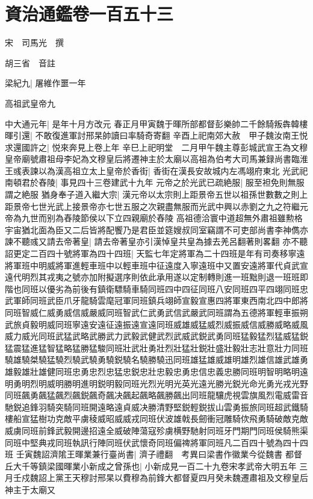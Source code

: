 \chapter{資治通鑑卷一百五十三}
宋　司馬光　撰

胡三省　音註

梁紀九|{
	屠維作噩一年}


高祖武皇帝九

中大通元年|{
	是年十月方改元}
春正月甲寅魏于暉所部都督彭樂帥二千餘騎叛犇韓樓暉引還|{
	不敢復進軍討邢杲帥讀曰率騎奇寄翻}
辛酉上祀南郊大赦　甲子魏汝南王悦求還國許之|{
	悦來奔見上卷上年}
辛巳上祀明堂　二月甲午魏主尊彭城武宣王為文穆皇帝廟號肅祖母李妃為文穆皇后將遷神主於太廟以高祖為伯考大司馬兼録尚書臨淮王彧表諫以為漢高祖立太上皇帝於香街|{
	香街在漢長安故城内左馮翊府東北}
光武祀南頓君於舂陵|{
	事見四十三卷建武十九年}
元帝之於光武已疏絶服|{
	服至袒免則無服謂之絶服}
猶身奉子道入繼大宗|{
	漢元帝以太宗則上距景帝五世以祖孫世數數之則上距景帝七世光武上接景帝亦七世五服之次親盡無服而光武中興以赤劉之九之符繼元帝為九世而别為舂陵節侯以下立四親廟於舂陵}
高祖德洽寰中道超無外肅祖雖勲格宇宙猶北面為臣又二后皆將配饗乃是君臣並筵嫂叔同室竊謂不可吏部尚書李神儁亦諫不聽彧又請去帝著皇|{
	請去帝著皇亦引漢悼皇共皇為據去羌呂翻著則畧翻}
亦不聽　詔更定二百四十號將軍為四十四班|{
	天監七年定將軍為二十四班是年有司奏移寧遠將軍班中明威將軍進輕車班中以輕車班中征遠度入寧遠班中又置安遠將軍代貞武宣遠代明烈其戎夷之號亦加附擬選序則依此承用遂以定制轉則進一班黜則退一班班即階也同班以優劣為前後有鎮衛驃騎車騎同班四中四征同班八安同班四平四翊同班忠武軍師同班武臣爪牙龍騎雲麾冠軍同班鎮兵翊師宣毅宣惠四將軍東西南北四中郎將同班智威仁威勇威信威嚴威同班智武仁武勇武信武嚴武同班謂為五德將軍輕車振朔武旅貞毅明威同班寧遠安遠征遠振遠宣遠同班威雄威猛威烈威振威信威勝威略威風威力威光同班武猛武略武勝武力武毅武健武烈武威武鋭武勇同班猛毅猛烈猛威猛鋭猛震猛進猛智猛略猛勝猛駿同班壯武壯勇壯烈壯猛壯鋭壯盛壯毅壯志壯意壯力同班驍雄驍桀驍猛驍烈驍武驍勇驍鋭驍名驍勝驍迅同班雄猛雄威雄明雄烈雄信雄武雄勇雄毅雄壯雄健同班忠勇忠烈忠猛忠鋭忠壯忠毅忠勇忠信忠義忠勝同班明智明略明遠明勇明烈明威明勝明進明鋭明毅同班光烈光明光英光遠光勝光鋭光命光勇光戎光野同班飆勇飆猛飆烈飆鋭飆奇飆决飆起飆略飆勝飆出同班龍驤虎視雲旗風烈電威雷音馳鋭追鋒羽騎突騎同班開遠略遠貞威决勝清野堅鋭輕鋭拔山雲勇振旅同班超武鐵騎樓船宣猛樹功克敵平虜稜威昭威威戎同班伏波雄戟長劒衝冠雕騎佽飛勇騎破敵克敵威虜同班前鋒武毅開邊招遠全威破陣蕩寇殄虜横野馳射同班牙門期門同班侯騎熊渠同班中堅典戎同班執訊行陣同班伏武懷奇同班偏禆將軍同班凡二百四十號為四十四班}
壬寅魏詔濟隂王暉業兼行臺尚書|{
	濟子禮翻　考異曰梁書作徽業今從魏書}
都督丘大千等鎮梁國暉業小新成之曾孫也|{
	小新成見一百二十九卷宋孝武帝大明五年}
三月壬戍魏詔上黨王天穆討邢杲以費穆為前鋒大都督夏四月癸未魏遷肅祖及文穆皇后神主于太廟又

